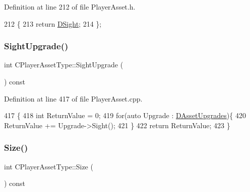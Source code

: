 Definition at line 212 of file Player\+Asset.\+h.


\begin{DoxyCode}
212                          \{
213             \textcolor{keywordflow}{return} \hyperlink{classCPlayerAssetType_afa32c3f45737443299a4e681dfe64911}{DSight};  
214         \};
\end{DoxyCode}
\hypertarget{classCPlayerAssetType_ac8789fc617ebd7b64f95bb1c1d95174d}{}\label{classCPlayerAssetType_ac8789fc617ebd7b64f95bb1c1d95174d} 
\subsubsection{\texorpdfstring{Sight\+Upgrade()}{SightUpgrade()}}
{\footnotesize\ttfamily int C\+Player\+Asset\+Type\+::\+Sight\+Upgrade (\begin{DoxyParamCaption}{ }\end{DoxyParamCaption}) const}



Definition at line 417 of file Player\+Asset.\+cpp.


\begin{DoxyCode}
417                                         \{
418     \textcolor{keywordtype}{int} ReturnValue = 0;
419     \textcolor{keywordflow}{for}(\textcolor{keyword}{auto} Upgrade : \hyperlink{classCPlayerAssetType_aeb8d5c3ea81ea56248d02a5e24d48001}{DAssetUpgrades})\{
420         ReturnValue += Upgrade->Sight();
421     \}
422     \textcolor{keywordflow}{return} ReturnValue;
423 \}
\end{DoxyCode}
\hypertarget{classCPlayerAssetType_afbddb44e9ff99768f18034bcc1daaeaa}{}\label{classCPlayerAssetType_afbddb44e9ff99768f18034bcc1daaeaa} 
\subsubsection{\texorpdfstring{Size()}{Size()}}
{\footnotesize\ttfamily int C\+Player\+Asset\+Type\+::\+Size (\begin{DoxyParamCaption}{ }\end{DoxyParamCaption}) const\hspace{0.3cm}{\ttfamily [inline]}}



